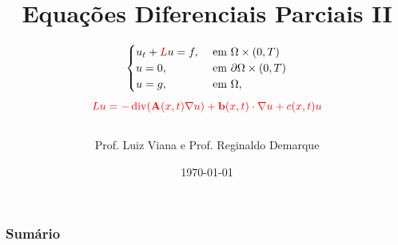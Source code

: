 \documentclass[envcountsect,aspectratio=169]{beamer}
\theoremstyle{example}
\theoremstyle{exercicio}
\DeclareMathOperator{\diver}{div}
\begin{document}
\title[EDP II]{Equações Diferenciais Parciais  II
}
\author[Prof. Luiz e Reginaldo]{
\vspace{-.5cm}
\begin{equation*}
{\normalsize {
\begin{cases}
u_t+{\color{red}L}u={f},& \text{ em } \Omega\times (0,T)\\
u=0, & \text{ em } \partial \Omega \times (0,T)\\
u=g, & \text{ em } \Omega,
\end{cases}}
}
\end{equation*}
\begin{equation*}
{\footnotesize {\color{red} 
Lu=-\diver(\mathbf{A}(x,t)\nabla u)+\mathbf{b}(x,t)\cdot \nabla u + c(x,t)u}
}
\end{equation*}\\
{\color{blue}Prof. Luiz Viana e Prof. Reginaldo Demarque}
}







{
	\vfill%
	\rlap{\hskip0.1cm\insertlogo}%
	\vskip10pt%
}



\date{{\color{orange} \today}}


\frame{\titlepage}



\begin{frame}
	\frametitle{Sumário}
		\tableofcontents
\end{frame}














\end{document}
